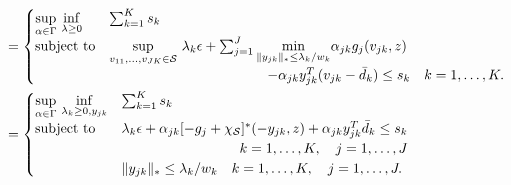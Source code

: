 {\begin{equation*}
\begin{aligned}
				&= \begin{cases}
					\underset{\alpha \in \Gamma}{\sup}~\underset{\lambda \geq 0}{\inf} &\sum_{k=1}^K s_k  \\
					\mbox{subject to}&\underset{v_{11}, \dots, v_{JK} \in \supp}{\sup}~ \lambda_k \epsilon+ \sum_{j=1}^J \underset{\|y_{jk}\|_* \leq \lambda_k/w_k}{\min} \alpha_{jk}g_j(v_{jk}, z) \\
					& \hspace{4cm} - \alpha_{jk}y_{jk}^T(v_{jk} - \bar{d}_k)\le s_k \quad k = 1,\dots,K.
				\end{cases}\\
&= \begin{cases}
	\underset{\alpha \in \Gamma}{\sup}~\underset{\lambda_k \geq 0, y_{jk}}{\inf} &  \sum_{k=1} ^K s_k \\
	\mbox{subject to}&\lambda_k \epsilon+ \alpha_{jk}[-g_j +\chi_{\supp}]^*(-y_{jk},z) +\alpha_{jk}y_{jk}^T\bar{d}_k \le s_k \\
	&\hfill \quad k = 1,\dots,K, \quad j = 1,\dots,J\\
	& \|y_{jk}\|_* \leq \lambda_k/w_k \quad k = 1,\dots,K, \quad j = 1,\dots,J.
\end{cases}\\
\end{aligned}
\end{equation*}
}
